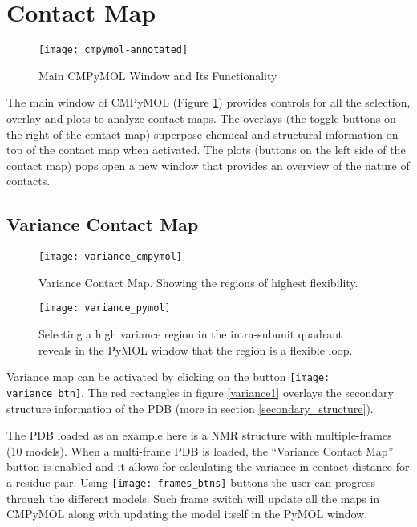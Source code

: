 \documentclass[11pt,fleqn]{book} %
\begin{document}
\section{Contact Map}

\begin{figure}[ht!]
\centering
  \begin{minipage}{\textwidth}
  \centering
      \texttt{[image: cmpymol-annotated]}
      \caption{Main CMPyMOL Window and Its Functionality}
  \label{cmpymol_annot}
  \end{minipage}
\end{figure}

The main window of CMPyMOL (Figure \ref{cmpymol_annot}) provides controls for all the selection, overlay and plots to analyze contact maps. The overlays (the toggle buttons on the right of the contact map) superpose chemical and structural information on top of the contact map when activated. The plots (buttons on the left side of the contact map) pops open a new window that provides an overview of the nature of contacts.

\subsection{Variance Contact Map}

\begin{figure}[ht!]
\centering
  \begin{minipage}[b]{0.45\textwidth}
  \centering
      \texttt{[image: variance\_cmpymol]}
      \caption{Variance Contact Map. Showing the regions of highest flexibility.}
  \label{variance1}
  \end{minipage}
  \quad
  \begin{minipage}[b]{0.45\textwidth}
  \centering
      \texttt{[image: variance\_pymol]}
      \caption{Selecting a high variance region in the intra-subunit quadrant reveals in the PyMOL window that the region is a flexible loop.}
  \label{variance2}
  \end{minipage}
\end{figure}

Variance map can be activated by clicking on the button \texttt{[image: variance\_btn]}. The {\color{red} red} rectangles in figure \ref{variance1} overlays the secondary structure information of the PDB (more in section \ref{secondary_structure}).

The PDB loaded as an example here is a NMR structure with multiple-frames (10 models). When a multi-frame PDB is loaded, the ``Variance Contact Map'' button is enabled and it allows for calculating the variance in contact distance for a residue pair. Using \texttt{[image: frames\_btns]} buttons the user can progress through the different models. Such frame switch will update all the maps in CMPyMOL along with updating the model itself in the PyMOL window.
\end{document}
